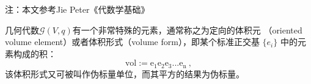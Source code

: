 
注：本文参考Jie Peter《代数学基础》

几何代数$\mathcal G(V,q)$有一个非常特殊的元素，通常称之为定向的体积元
（oriented volume element）或者体积形式（volume form），即某个标准正交基 $\{e_i\}$ 中的元素构成的积：
$$\mathrm {vol:=e_1e_2e_3...e_n}~,$$
该体积形式又可被叫作伪标量单位，而其平方的结果为伪标量。